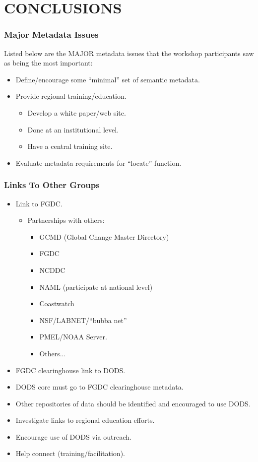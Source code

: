 \section{CONCLUSIONS}

\subsubsection{Major Metadata Issues}

Listed below are the MAJOR metadata issues that the workshop participants saw as being the 
most important:
\begin{itemize}
\item Define/encourage some ``minimal'' set of semantic metadata.
\item Provide regional training/education.
\begin{itemize}
  \item Develop a white paper/web site.
  \item Done at an institutional level.
  \item Have a central training site.
\end{itemize}
\item Evaluate metadata requirements for ``locate'' function.
\end{itemize}

\subsubsection{Links To Other Groups}
\begin{itemize}
\item Link to FGDC. 
\begin{itemize}
\item Partnerships with others:
\begin{itemize}
\item GCMD (Global Change Master Directory)
\item FGDC
\item NCDDC
\item NAML (participate at national level)
\item Coastwatch
\item NSF/LABNET/``bubba net''
\item PMEL/NOAA Server.
\item Others...
\end{itemize}
\end{itemize}
\item FGDC clearinghouse link to DODS.
\item DODS core must go to FGDC clearinghouse metadata.
\item Other repositories of data should be identified and encouraged to use DODS.
\item Investigate links to regional education efforts.
\item Encourage use of DODS via outreach.
\item Help connect (training/facilitation).
\end{itemize}

